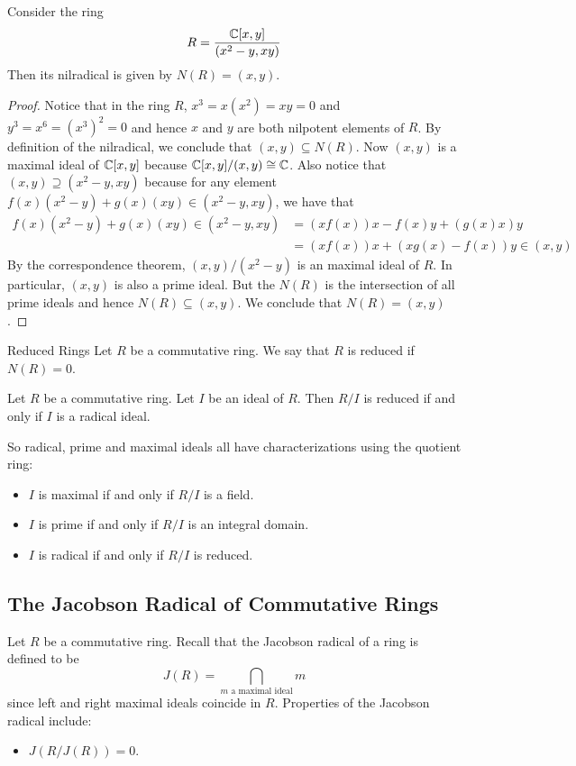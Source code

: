 \documentclass[a4paper]{article}
\begin{document}
\begin{eg}{}{} Consider the ring $$R=\frac{\mathbb{C}[x,y]}{(x^2-y,xy)}$$ Then its nilradical is given by $N(R)=(x,y)$. \tcbline
\begin{proof}
Notice that in the ring $R$, $x^3=x(x^2)=xy=0$ and $y^3=x^6=(x^3)^2=0$ and hence $x$ and $y$ are both nilpotent elements of $R$. By definition of the nilradical, we conclude that $(x,y)\subseteq N(R)$. Now $(x,y)$ is a maximal ideal of $\mathbb{C}[x,y]$ because $\mathbb{C}[x,y]/(x,y)\cong\mathbb{C}$. Also notice that $(x,y)\supseteq(x^2-y,xy)$ because for any element $f(x)(x^2-y)+g(x)(xy)\in(x^2-y,xy)$, we have that 
\begin{align*}
f(x)(x^2-y)+g(x)(xy)\in(x^2-y,xy)&=(xf(x))x-f(x)y+(g(x)x)y\\
&=(xf(x))x+(xg(x)-f(x))y\in (x,y)
\end{align*}
By the correspondence theorem, $(x,y)/(x^2-y)$ is an maximal ideal of $R$. In particular, $(x,y)$ is also a prime ideal. But the $N(R)$ is the intersection of all prime ideals and hence $N(R)\subseteq(x,y)$. We conclude that $N(R)=(x,y)$. 
\end{proof}
\end{eg}

\begin{defn}{Reduced Rings}{} Let $R$ be a commutative ring. We say that $R$ is reduced if $N(R)=0$. 
\end{defn}

\begin{prp}{}{} Let $R$ be a commutative ring. Let $I$ be an ideal of $R$. Then $R/I$ is reduced if and only if $I$ is a radical ideal. 
\end{prp}

So radical, prime and maximal ideals all have characterizations using the quotient ring: 
\begin{itemize}
\item $I$ is maximal if and only if $R/I$ is a field. 
\item $I$ is prime if and only if $R/I$ is an integral domain. 
\item $I$ is radical if and only if $R/I$ is reduced. 
\end{itemize}

\subsection{The Jacobson Radical of Commutative Rings}
Let $R$ be a commutative ring. Recall that the Jacobson radical of a ring is defined to be $$J(R)=\bigcap_{m\text{ a maximal ideal}}m$$ since left and right maximal ideals coincide in $R$. Properties of the Jacobson radical include: 
\begin{itemize}
\item $J(R/J(R))=0$. 
\end{itemize}
\end{document}

